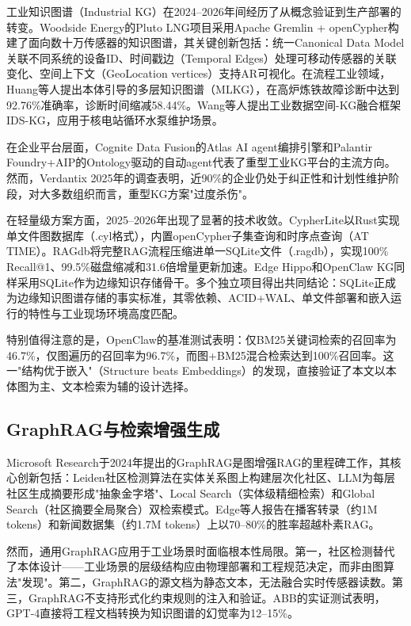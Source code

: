 \documentclass[12pt,a4paper]{article}
\begin{document}
工业知识图谱（Industrial KG）在2024--2026年间经历了从概念验证到生产部署的转变。Woodside Energy的Pluto LNG项目\cite{woodside2024}采用Apache Gremlin + openCypher构建了面向数十万传感器的知识图谱，其关键创新包括：统一Canonical Data Model关联不同系统的设备ID、时间戳边（Temporal Edges）处理可移动传感器的关联变化、空间上下文（GeoLocation vertices）支持AR可视化。在流程工业领域，Huang等人\cite{huang2024ontology}提出本体引导的多层知识图谱（MLKG），在高炉炼铁故障诊断中达到92.76\%准确率，诊断时间缩减58.44\%。Wang等人\cite{wang2024idskg}提出工业数据空间-KG融合框架IDS-KG，应用于核电站循环水泵维护场景。

在企业平台层面，Cognite Data Fusion的Atlas AI agent编排引擎和Palantir Foundry+AIP的Ontology驱动的自动agent代表了重型工业KG平台的主流方向。然而，Verdantix 2025年的调查表明，近90\%的企业仍处于纠正性和计划性维护阶段，对大多数组织而言，重型KG方案"过度杀伤"\cite{verdantix2025}。

在轻量级方案方面，2025--2026年出现了显著的技术收敛。CypherLite\cite{cypherlite2026}以Rust实现单文件图数据库（.cyl格式），内置openCypher子集查询和时序点查询（AT TIME）。RAGdb\cite{khalid2025ragdb}将完整RAG流程压缩进单一SQLite文件（.ragdb），实现100\% Recall@1、99.5\%磁盘缩减和31.6倍增量更新加速。Edge Hippo\cite{edgehippo2025}和OpenClaw KG\cite{openclaw2025}同样采用SQLite作为边缘知识存储骨干。多个独立项目得出共同结论：SQLite正成为边缘知识图谱存储的事实标准，其零依赖、ACID+WAL、单文件部署和嵌入运行的特性与工业现场环境高度匹配。

特别值得注意的是，OpenClaw的基准测试表明\cite{openclaw2025}：仅BM25关键词检索的召回率为46.7\%，仅图遍历的召回率为96.7\%，而图+BM25混合检索达到100\%召回率。这一"结构优于嵌入"（Structure beats Embeddings）的发现，直接验证了本文以本体图为主、文本检索为辅的设计选择。

\subsection{GraphRAG与检索增强生成}

Microsoft Research于2024年提出的GraphRAG\cite{graphrag2024}是图增强RAG的里程碑工作，其核心创新包括：Leiden社区检测算法在实体关系图上构建层次化社区、LLM为每层社区生成摘要形成"抽象金字塔"、Local Search（实体级精细检索）和Global Search（社区摘要全局聚合）双检索模式。Edge等人报告在播客转录（约1M tokens）和新闻数据集（约1.7M tokens）上以70--80\%的胜率超越朴素RAG。

然而，通用GraphRAG应用于工业场景时面临根本性局限。第一，社区检测替代了本体设计——工业场景的层级结构应由物理部署和工程规范决定，而非由图算法"发现"。第二，GraphRAG的源文档为静态文本，无法融合实时传感器读数。第三，GraphRAG不支持形式化约束规则的注入和验证。ABB的实证测试表明\cite{abb2025llm}，GPT-4直接将工程文档转换为知识图谱的幻觉率为12--15\%。
\end{document}
